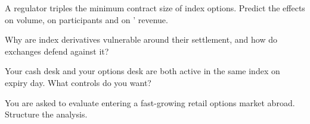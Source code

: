 \begin{interviewq}\label{iq:m1:options-markets-europe-asia:3}
A regulator triples the minimum contract size of index options. Predict the
effects on volume, on participants and on ' revenue.
\end{interviewq}

\begin{interviewq}\label{iq:m1:options-markets-europe-asia:4}
Why are  index derivatives vulnerable around their settlement,
and how do exchanges defend against it?
\end{interviewq}

\begin{interviewq}\label{iq:m1:options-markets-europe-asia:5}
Your cash desk and your options desk are both active in the same index on
expiry day. What controls do you want?
\end{interviewq}

\begin{interviewq}\label{iq:m1:options-markets-europe-asia:6}
You are asked to evaluate entering a fast-growing retail options market
abroad. Structure the analysis.
\end{interviewq}
